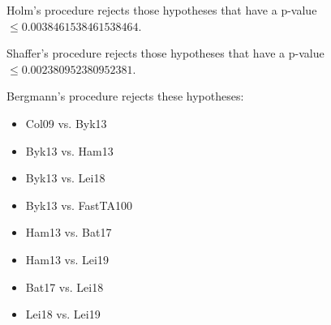 \documentclass[a4paper,10pt]{article}
\begin{document}
\begin{landscape}
Holm's procedure rejects those hypotheses that have a p-value $\le0.0038461538461538464$.


Shaffer's procedure rejects those hypotheses that have a p-value $\le0.002380952380952381$.


Bergmann's procedure rejects these hypotheses:


\begin{itemize}


\item Col09 vs. Byk13
\item Byk13 vs. Ham13
\item Byk13 vs. Lei18
\item Byk13 vs. FastTA100
\item Ham13 vs. Bat17
\item Ham13 vs. Lei19
\item Bat17 vs. Lei18
\item Lei18 vs. Lei19
\end{itemize}



\end{landscape}
\end{document}

